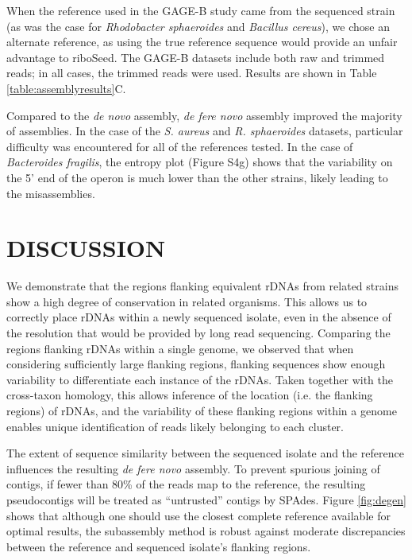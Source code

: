 \documentclass[a4,center,fleqn]{NAR}
\begin{document}
When the reference used in the GAGE-B study came from the sequenced strain (as was the case for \textit{Rhodobacter sphaeroides}  and  \textit{Bacillus cereus}), we chose an alternate reference, as using the true reference sequence would provide an unfair advantage to riboSeed. The GAGE-B datasets include both raw and trimmed reads; in all cases, the trimmed reads were used. Results are shown in Table \ref{table:assemblyresults}C.

Compared to the \textit{de novo} assembly, \textit{de fere novo} assembly improved the majority of assemblies. In the case of the \textit{S. aureus} and \textit{R. sphaeroides} datasets, particular difficulty was encountered for all of the references tested. In the case of \textit{Bacteroides fragilis}, the entropy plot (Figure S4g) shows that the variability on the 5' end of the operon is much lower than the other strains, likely leading to the misassemblies.

\section*{DISCUSSION}
We demonstrate that the regions flanking equivalent rDNAs from related strains show a high degree of conservation in related organisms. This allows us to correctly place rDNAs within a newly sequenced isolate, even in the absence of the resolution that would be provided by long read sequencing. Comparing the regions flanking rDNAs within a single genome, we observed that when considering sufficiently large flanking regions, flanking sequences show enough variability to differentiate each instance of the rDNAs. Taken together with the cross-taxon homology, this allows inference of the location (i.e. the flanking regions) of rDNAs, and the variability of these flanking regions within a genome enables unique identification of reads likely belonging to each cluster.

The extent of sequence similarity between the sequenced isolate and the reference influences the resulting \textit{de fere novo} assembly. To prevent spurious joining of contigs, if fewer than 80\% of the reads map to the reference, the resulting pseudocontigs will be treated as ``untrusted'' contigs by SPAdes. Figure \ref{fig:degen} shows that although one should use the closest complete reference available for optimal results, the subassembly method is robust against moderate discrepancies between the reference and sequenced isolate's flanking regions.
\end{document}
